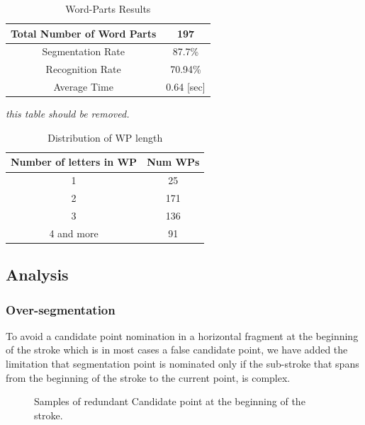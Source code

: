 \documentclass[journal,compsoc]{IEEEtran}
\begin{document}
\begin{table}[h]
\caption{Word-Parts Results}
\begin{tabular}{ | c | c | }
  \hline                     
    Total Number of Word Parts & 197 \\ 
  \hline
  Segmentation Rate &  87.7\% \\ 
 \hline
  Recognition Rate &  70.94\% \\ 
 \hline
  Average Time & 0.64 [sec] \\
\hline
\end{tabular}
\centering
\label{table:wp_results} 
\end{table}

\emph{this table should be removed.}
\begin{table}[h]
\caption{Distribution of WP length}
\begin{tabular}{ | c | c | }
\hline
Number of letters in WP & Num WPs\\
  \hline                     
    1 & 25 \\ 
  \hline
  2 &  171 \\ 
 \hline
 3 & 136 \\ 
 \hline
  4 and more & 91 \\
\hline
\end{tabular}
\centering
\label{table:wp_length_dist} 
\end{table}


\subsection{Analysis}

\subsubsection{Over-segmentation}

To avoid a candidate point nomination in a horizontal fragment at the beginning of the stroke which is in most cases a false candidate point, we have added the limitation that segmentation point is nominated only if the sub-stroke that spans from the beginning of the stroke to the current point, is complex.
\begin{figure}[h]
\centering
    \caption{Samples of redundant Candidate point at the beginning of the  stroke.}
   \label{fig:oversegmentation_begin}
\end{figure}
\end{document}
